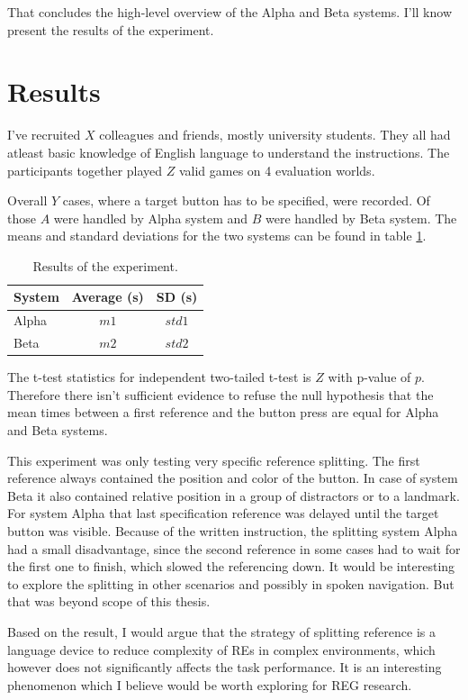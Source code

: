 That concludes the high-level overview of the Alpha and Beta systems. I'll know present the results of the experiment.

\section{Results}
I've recruited $X$ colleagues and friends, mostly university students. They all had atleast basic knowledge of English language to understand the instructions. The participants together played $Z$ valid games on 4 evaluation worlds.

Overall $Y$ cases, where a target button has to be specified, were recorded. Of those $A$ were handled by Alpha system and $B$ were handled by Beta system. The means and standard deviations for the two systems can be found in table \ref{tab:meanexper}.

\begin{table}[!htbp]
 \centering
\begin{tabular}{lcc}
\toprule
System   & Average (s) & SD (s)  \\
\midrule
Alpha   & $m1$ & $std1$ \\
Beta 	& $m2$ & $std2$ \\
\bottomrule
\end{tabular}
\caption{Results of the experiment.}
\label{tab:meanexper}
\end{table}

The t-test statistics for independent two-tailed t-test is $Z$ with p-value of $p$. Therefore there isn't sufficient evidence to refuse the null hypothesis that the mean times between a first reference and the button press are equal for Alpha and Beta systems.

This experiment was only testing very specific reference splitting. The first reference always contained the position and color of the button. In case of system Beta it also contained relative position in a group of distractors or to a landmark. For system Alpha that last specification reference was delayed until the target button was visible. Because of the written instruction, the splitting system Alpha had a small disadvantage, since the second reference in some cases had to wait for the first one to finish, which slowed the referencing down. It would be interesting to explore the splitting in other scenarios and possibly in spoken navigation. But that was beyond scope of this thesis.

Based on the result, I would argue that the strategy of splitting reference is a language device to reduce complexity of REs in complex environments, which however does not significantly affects the task performance. It is an interesting phenomenon which I believe would be worth exploring for REG research.